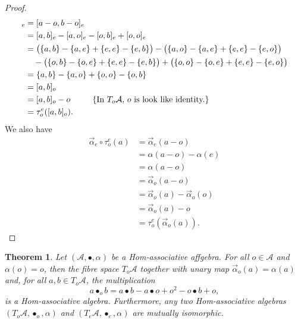 \documentclass[14pt]{article}
\newtheorem{Thm}[thm]{Theorem}
\theoremstyle{Definition}
\theoremstyle{remark}
\begin{document}
\begin{proof}
\begin{align*}
[\tau_{o}^{e}(a),\tau^{e}_{o}(b)]_{e}&=[a-o,b-o]_{e}\\
&=[a,b]_{e}-[a,o]_{e}-[o,b]_{e}+[o,o]_{e}\\
&=\big{(}\{a,b\}-\{a,e\}+\{e,e\}-\{e,b\}\big{)}-\big{(}\{a,o\}-\{a,e\}+\{e,e\}-\{e,o\}\big{)}\\
&~~~-\big{(}\{o,b\}-\{o,e\}+\{e,e\}-\{e,b\}\big{)}+\big{(}\{o,o\}-\{o,e\}+\{e,e\}-\{e,o\}\big{)}\\
&=\{a,b\}-\{a,o\}+\{o,o\}-\{o,b\}\\
&=[a,b]_{o}\\
&=[a,b]_{o}-o~~~~~~~~\text{\{In $T_{o}\mathcal{A}$, $o$ is look like identity.\}}\\
&=\tau_{o}^{e}([a,b]_{o}).
\end{align*}
We also have
\begin{align*}
\overrightarrow{\alpha}_{e}\circ\tau_{o}^{e}(a)&=\overrightarrow{\alpha}_{e}(a-o)\\
&=\alpha(a-o)-\alpha(e)\\
&=\alpha(a-o)\\
&=\overrightarrow{\alpha}_{o}(a-o)\\
&=\overrightarrow{\alpha}_{o}(a)-\overrightarrow{\alpha}_{o}(o)\\
&=\overrightarrow{\alpha}_{o}(a)-o\\
&=\tau_{o}^{e}(\overrightarrow{\alpha}_{o}(a)).
\end{align*}
\end{proof}
\begin{Thm}
Let $(\mathcal{A},\bullet,\alpha)$ be a Hom-associative affgebra. For all $o\in \mathcal{A}$ and $\alpha(o)=o$, then the fibre space $T_{o}\mathcal{A}$ together with unary map $\overrightarrow{\alpha}_{o}(a)=\alpha(a)$ and, for all $a,b\in T_{o}\mathcal{A}$, the multiplication 
\[
a\bullet_{o}b=a\bullet b-a\bullet o+o^{2}-o\bullet b+o,
\]
is a Hom-associative algebra. Furthermore, any two Hom-associative algebras $(T_{o}\mathcal{A},\bullet_{o},\alpha)$ and $(T_{e}\mathcal{A},\bullet_{e},\alpha)$ are mutually isomorphic.
\end{Thm}
\end{document}
